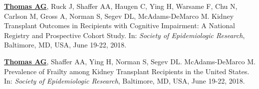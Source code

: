 \documentclass[10pt]{article}
\makeatletter
\newlength{\bibhang}
\newlength{\bibsep}
 {\@listi \global\bibsep\itemsep \global\advance\bibsep by\parsep}
\newenvironment{bibenum*}
  {\renewcommand\labelenumi{[\theenumi]}%
   \etaremune[
     topsep=0pt,
     itemsep=\bibsep,
     parsep=0pt,partopsep=0pt,
     itemindent=-\bibhang,
     leftmargin={\bibhang+\widthof{[999]}}]}
  {\endetaremune}
\makeatother
\begin{document}
\begin{bibenum*}

\item \underline{\textbf{Thomas AG}}, Ruck J, Shaffer AA, Haugen C,
  Ying H, Warsame F, Chu N, Carlson M, Gross A, Norman S, Segev DL,
  McAdams-DeMarco M.
  Kidney Transplant Outcomes in Recipients with Cognitive Impairment:
  A National Registry and Prospective Cohort Study.
  In: \emph{Society of Epidemiologic Research},
  Baltimore, MD, USA, June 19-22, 2018.

\item \underline{\textbf{Thomas AG}}, Shaffer AA, Ying H, Norman S,
  Segev DL. McAdams-DeMarco M.
  Prevalence of Frailty among Kidney Transplant Recipients in the United States.
  In: \emph{Society of Epidemiologic Research},
  Baltimore, MD, USA, June 19-22, 2018.






\end{bibenum*}
\end{document}
